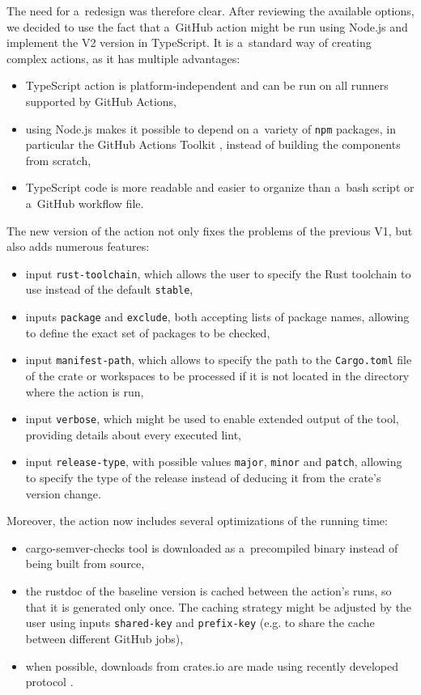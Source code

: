 \documentclass[licencjacka,en]{pracamgr}
\begin{document}
The need for a~redesign was therefore clear. After reviewing the available options,
we decided to use the fact that a~GitHub action might
be run using Node.js and implement the V2 version in TypeScript. It is a~standard way
of creating complex actions, as it has multiple advantages:
\begin{itemize}
	\item TypeScript action is platform-independent and can be run on all runners supported by GitHub Actions,
	\item using Node.js makes it possible to depend on a~variety of \texttt{npm} packages, in particular the GitHub Actions
		Toolkit \cite{github_actions_toolkit}, instead of building the components from scratch,
	\item TypeScript code is more readable and easier to organize than a~bash script or a~GitHub workflow file.
\end{itemize}
The new version of the action not only fixes the problems of the previous V1, but also
adds numerous features:
\begin{itemize}
	\item input \texttt{rust-toolchain}, which allows the user to specify the Rust toolchain to use instead
		of the default \texttt{stable},
	\item inputs \texttt{package} and \texttt{exclude}, both accepting lists of package names,
		allowing to define the exact set of packages to be checked,
	\item input \texttt{manifest-path}, which allows to specify the path to the \texttt{Cargo.toml} file
		of the crate or workspaces to be processed if it is not located in the directory where
		the action is run,
	\item input \texttt{verbose}, which might be used to enable extended output of the tool,
		providing details about every executed lint,
	\item input \texttt{release-type}, with possible values \texttt{major}, \texttt{minor} and \texttt{patch},
		allowing to specify the type of the release instead of deducing it from the crate's version change.
\end{itemize}
Moreover, the action now includes several optimizations of the running time:
\begin{itemize}
	\item cargo-semver-checks tool is downloaded as a~precompiled binary instead of being built from source,
	\item the rustdoc of the baseline version is cached between the action's runs, so that it is generated
		only once. The caching strategy might be adjusted by the user using inputs \texttt{shared-key}
		and \texttt{prefix-key} (e.g. to share the cache between different GitHub jobs),
	\item when possible, downloads from crates.io are made using recently developed  protocol
		\cite{crates_io_sparse_protocol}.
\end{itemize}
\end{document}
